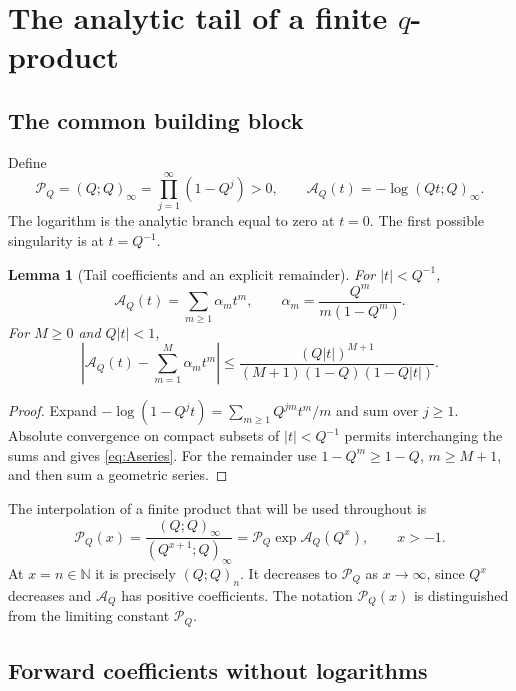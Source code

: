 \documentclass[11pt]{article}
\numberwithin{equation}{section}
\newtheorem{lemma}[theorem]{Lemma}
\theoremstyle{definition}
\newcommand{\N}{\mathbb N}
\newcommand{\pp}[1]{(Q;Q)_{#1}}
\newcommand{\Pinf}{\mathcal P_Q}
\newcommand{\A}{\mathcal A_Q}
\begin{document}
\section{The analytic tail of a finite \texorpdfstring{$q$}{q}-product}
\label{sec:qtail}

\subsection{The common building block}

Define
\begin{equation}\label{eq:pinf}
 \Pinf=(Q;Q)_\infty=\prod_{j=1}^{\infty}(1-Q^j)>0,
 \qquad
 \A(t)=-\log(Qt;Q)_\infty.
\end{equation}
The logarithm is the analytic branch equal to zero at $t=0$. The first possible singularity is at $t=Q^{-1}$.

\begin{lemma}[Tail coefficients and an explicit remainder]\label{lem:Atail}
For $|t|<Q^{-1}$,
\begin{equation}\label{eq:Aseries}
 \A(t)=\sum_{m\ge1}\alpha_m t^m,
 \qquad \alpha_m=\frac{Q^m}{m(1-Q^m)}.
\end{equation}
For $M\ge0$ and $Q|t|<1$,
\begin{equation}\label{eq:Atailbound}
 \left|\A(t)-\sum_{m=1}^M\alpha_m t^m\right|
 \le \frac{(Q|t|)^{M+1}}
 {(M+1)(1-Q)(1-Q|t|)}.
\end{equation}
\end{lemma}
\begin{proof}
Expand $-\log(1-Q^jt)=\sum_{m\ge1}Q^{jm}t^m/m$ and sum over $j\ge1$. Absolute convergence on compact subsets of $|t|<Q^{-1}$ permits interchanging the sums and gives \eqref{eq:Aseries}. For the remainder use $1-Q^m\ge1-Q$, $m\ge M+1$, and then sum a geometric series.
\end{proof}

The interpolation of a finite product that will be used throughout is
\begin{equation}\label{eq:product-interpolation}
 \mathcal P_Q(x)=\frac{(Q;Q)_\infty}{(Q^{x+1};Q)_\infty}
 =\Pinf\exp\A(Q^x),\qquad x>-1.
\end{equation}
At $x=n\in\N$ it is precisely $\pp{n}$. It decreases to $\Pinf$ as $x\to\infty$, since $Q^x$ decreases and $\A$ has positive coefficients. The notation $\mathcal P_Q(x)$ is distinguished from the limiting constant $\Pinf$.

\subsection{Forward coefficients without logarithms}
\end{document}
